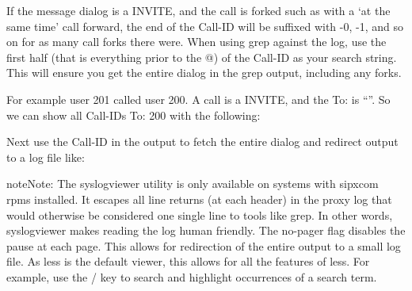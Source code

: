 \documentclass[letterpaper,10pt,english]{sphinxmanual}
\begin{document}
If the message dialog is a INVITE, and the call is forked such as with a ‘at the same time’ call forward, the end of the Call-ID will be suffixed with -0, -1, and so on for as many call forks there were.
When using grep against the log, use the first half (that is everything prior to the @) of the Call-ID as your search string. This will ensure you get the entire dialog in the grep output, including any forks.

For example user 201 called user 200. A call is a INVITE, and the To: is “”. So we can show all Call-IDs To: 200 with the following:

\begin{sphinxVerbatim}[commandchars=\\\{\}]
 
\end{sphinxVerbatim}

Next use the Call-ID in the output to fetch the entire dialog and redirect output to a log file like:

\begin{sphinxVerbatim}[commandchars=\\\{\}]
\end{sphinxVerbatim}

\begin{sphinxadmonition}{note}{Note:}
The syslogviewer utility is only available on systems with sipxcom rpms installed.
It escapes all line returns (at each header) in the proxy log that would otherwise be considered one single line to tools like grep.
In other words, syslogviewer makes reading the log human friendly. The \textendash{}no-pager flag disables the pause at each page.
This allows for redirection of the entire output to a small log file. As less is the default viewer, this allows for all the features of less.
For example, use the / key to search and highlight occurrences of a search term.
\end{sphinxadmonition}
\end{document}
